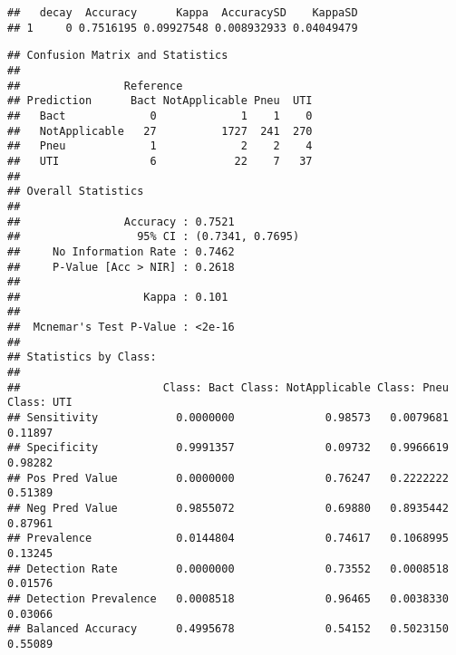 \documentclass[
]{book}
\newenvironment{Shaded}{\begin{snugshade}}{\end{snugshade}}
\newcommand{\FunctionTok}[1]{\textcolor[rgb]{0.13,0.29,0.53}{\textbf{#1}}}
\newcommand{\NormalTok}[1]{#1}
\newcommand{\SpecialCharTok}[1]{\textcolor[rgb]{0.81,0.36,0.00}{\textbf{#1}}}
\begin{document}
\begin{Shaded}
\end{Shaded}

\begin{verbatim}
##   decay  Accuracy      Kappa  AccuracySD    KappaSD
## 1     0 0.7516195 0.09927548 0.008932933 0.04049479
\end{verbatim}

\begin{Shaded}
\end{Shaded}

\begin{verbatim}
## Confusion Matrix and Statistics
## 
##                Reference
## Prediction      Bact NotApplicable Pneu  UTI
##   Bact             0             1    1    0
##   NotApplicable   27          1727  241  270
##   Pneu             1             2    2    4
##   UTI              6            22    7   37
## 
## Overall Statistics
##                                           
##                Accuracy : 0.7521          
##                  95% CI : (0.7341, 0.7695)
##     No Information Rate : 0.7462          
##     P-Value [Acc > NIR] : 0.2618          
##                                           
##                   Kappa : 0.101           
##                                           
##  Mcnemar's Test P-Value : <2e-16          
## 
## Statistics by Class:
## 
##                      Class: Bact Class: NotApplicable Class: Pneu Class: UTI
## Sensitivity            0.0000000              0.98573   0.0079681    0.11897
## Specificity            0.9991357              0.09732   0.9966619    0.98282
## Pos Pred Value         0.0000000              0.76247   0.2222222    0.51389
## Neg Pred Value         0.9855072              0.69880   0.8935442    0.87961
## Prevalence             0.0144804              0.74617   0.1068995    0.13245
## Detection Rate         0.0000000              0.73552   0.0008518    0.01576
## Detection Prevalence   0.0008518              0.96465   0.0038330    0.03066
## Balanced Accuracy      0.4995678              0.54152   0.5023150    0.55089
\end{verbatim}
\end{document}
